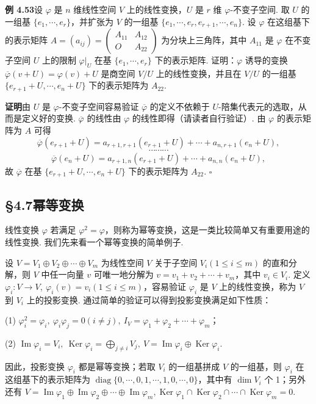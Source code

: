 \documentclass[UTF8,12pt,a4paper,fontset=fandol]{ctexart}
\begin{document}
\noindent\textbf{例 4.53}\quad 设 $\varphi$ 是 $n$ 维线性空间 $V$ 上的线性变换，$U$ 是 $r$ 维 $\varphi$-不变子空间. 取 $U$ 的一组基 $\{e_1,\cdots,e_r\}$，并扩张为 $V$ 的一组基 $\{e_1,\cdots,e_r,e_{r+1},\cdots,e_n\}$. 设 $\varphi$ 在这组基下的表示矩阵 $A=(a_{ij})=\left(\begin{array}{cc}A_{11}&A_{12}\\O&A_{22}\end{array}\right)$ 为分块上三角阵，其中 $A_{11}$ 是 $\varphi$ 在不变子空间 $U$ 上的限制 $\varphi|_U$ 在基 $\{e_1,\cdots,e_r\}$ 下的表示矩阵. 证明：$\varphi$ 诱导的变换 $\overline{\varphi}(v+U)=\varphi(v)+U$ 是商空间 $V/U$ 上的线性变换，并且在 $V/U$ 的一组基 $\{e_{r+1}+U,\cdots,e_n+U\}$ 下的表示矩阵为 $A_{22}$.

\noindent\textbf{证明}\quad 由 $U$ 是 $\varphi$-不变子空间容易验证 $\overline{\varphi}$ 的定义不依赖于 $U$-陪集代表元的选取，从而是定义好的变换. $\overline{\varphi}$ 的线性由 $\varphi$ 的线性即得（请读者自行验证）. 由 $\varphi$ 的表示矩阵为 $A$ 可得
\[
\overline{\varphi}(e_{r+1}+U)=a_{r+1,r+1}(e_{r+1}+U)+\cdots+a_{n,r+1}(e_n+U),
\]
\[
\cdots\cdots\cdots
\]
\[
\overline{\varphi}(e_n+U)=a_{r+1,n}(e_{r+1}+U)+\cdots+a_{n,n}(e_n+U),
\]
故 $\overline{\varphi}$ 在基 $\{e_{r+1}+U,\cdots,e_n+U\}$ 下的表示矩阵为 $A_{22}$. $\square$

\subsection*{§4.7\quad 幂等变换}

线性变换 $\varphi$ 若满足 $\varphi^2=\varphi$，则称为幂等变换，这是一类比较简单又有重要用途的线性变换. 我们先来看一个幂等变换的简单例子.

设 $V=V_1\oplus V_2\oplus\cdots\oplus V_m$ 为线性空间 $V$ 关于子空间 $V_i(1\le i\le m)$ 的直和分解，则 $V$ 中任一向量 $v$ 可唯一地分解为 $v=v_1+v_2+\cdots+v_m$，其中 $v_i\in V_i$. 定义 $\varphi_i:V\to V,\ \varphi_i(v)=v_i(1\le i\le m)$，容易验证 $\varphi_i$ 是 $V$ 上的线性变换，称为 $V$ 到 $V_i$ 上的投影变换. 通过简单的验证可以得到投影变换满足如下性质：

(1) $\varphi_i^2=\varphi_i,\ \varphi_i\varphi_j=0(i\ne j),\ I_V=\varphi_1+\varphi_2+\cdots+\varphi_m$；

(2) $\operatorname{Im}\varphi_i=V_i,\ \operatorname{Ker}\varphi_i=\bigoplus_{j\ne i}V_j,\ V=\operatorname{Im}\varphi_i\oplus\operatorname{Ker}\varphi_i$.

因此，投影变换 $\varphi_i$ 都是幂等变换；若取 $V_i$ 的一组基拼成 $V$ 的一组基，则 $\varphi_i$ 在这组基下的表示矩阵为 $\operatorname{diag}\{0,\cdots,0,1,\cdots,1,0,\cdots,0\}$，其中有 $\dim V_i$ 个 1；另外还有 $V=\operatorname{Im}\varphi_1\oplus\operatorname{Im}\varphi_2\oplus\cdots\oplus\operatorname{Im}\varphi_m,\operatorname{Ker}\varphi_1\cap\operatorname{Ker}\varphi_2\cap\cdots\cap\operatorname{Ker}\varphi_m=0$.
\end{document}
